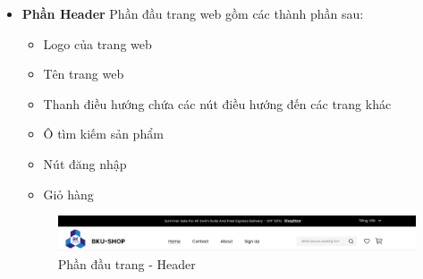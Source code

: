 \begin{itemize}
    \item \textbf{Phần Header}
    \newline
    Phần đầu trang web gồm các thành phần sau:
    \begin{itemize}
        \item Logo của trang web
        \item Tên trang web
        \item Thanh điều hướng chứa các nút điều hướng đến các trang khác
        \item Ô tìm kiếm sản phẩm
        \item Nút đăng nhập
        \item Giỏ hàng
    \end{itemize}
    \begin{figure}[H]
        \begin{center}
        \includegraphics[scale=0.5]{images/hieu/chap-4/header.png}
        \vspace*{5mm}
        \caption{Phần đầu trang - Header}
        \end{center}
    \end{figure}


\end{itemize}
